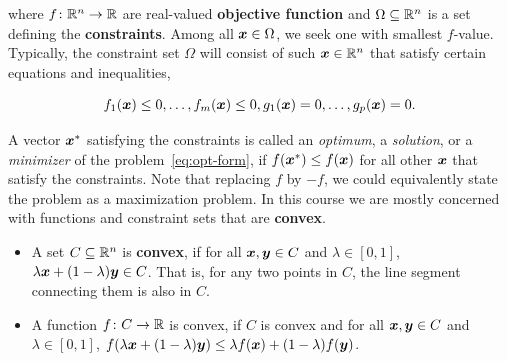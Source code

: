 where $f\colon \mathbb{R}^n\to \mathbb{R}$ are real-valued \textbf{objective function} and $\Omega\subseteq \mathbb{R}^n$ is a set defining the \textbf{constraints}.
Among all $\bm{x}\in \Omega$, we seek one with smallest $f$-value. Typically, the constraint set $\Omega$ will consist of such $\bm{x}\in \mathbb{R}^n$ that satisfy certain equations and inequalities,

\begin{equation*}
f_1(\bm{x})\leq 0, \dots, f_m(\bm{x})\leq 0, g_1(\bm{x})=0, \dots, g_p(\bm{x})=0.
\end{equation*}

A vector $\bm{x}^*$ satisfying the constraints is called an {\em optimum}, a {\em solution}, or a {\em minimizer} of the problem~\eqref{eq:opt-form}, if $f(\bm{x}^*)\leq f(\bm{x})$ for all other $\bm{x}$ that satisfy the constraints. Note that replacing $f$ by $-f$, we could equivalently state the problem as a maximization problem. In this course we are mostly concerned with functions and constraint sets that are \textbf{convex}.

\begin{itemize}
\item A set $C\subseteq \mathbb{R}^n$ is \textbf{convex}, if for all $\bm{x},\bm{y}\in C$ and $\lambda\in [0,1]$, $\lambda \bm{x}+(1-\lambda)\bm{y}\in C$. That is, for any two points in $C$, the line segment connecting them is also in $C$. 
\item A function $f\colon C\to \mathbb{R}$ is convex, if $C$ is convex and for all $\bm{x}, \bm{y}\in C$ and $\lambda\in [0,1]$, $f(\lambda \bm{x}+(1-\lambda)\bm{y})\leq \lambda f(\bm{x})+(1-\lambda)f(\bm{y})$. 
\end{itemize}

